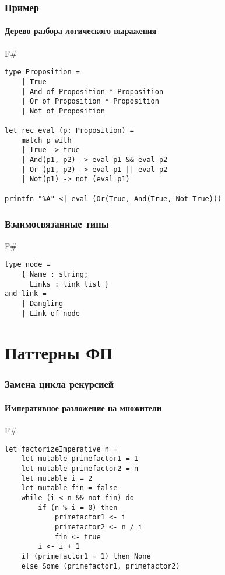 \documentclass[xetex,mathserif,serif]{beamer}
\begin{document}
	\begin{frame}[fragile]
		\frametitle{Пример}
		\framesubtitle{Дерево разбора логического выражения}
		\begin{exampleblock}{F\#}
			\begin{lstlisting}
type Proposition =
    | True
    | And of Proposition * Proposition
    | Or of Proposition * Proposition
    | Not of Proposition

let rec eval (p: Proposition) =
    match p with
    | True -> true
    | And(p1, p2) -> eval p1 && eval p2
    | Or (p1, p2) -> eval p1 || eval p2
    | Not(p1) -> not (eval p1)

printfn "%A" <| eval (Or(True, And(True, Not True)))
\end{lstlisting}
\end{exampleblock}
		
\end{frame}

	\begin{frame}[fragile]
		\frametitle{Взаимосвязанные типы}
		\begin{exampleblock}{F\#}
			\begin{lstlisting}
type node =
    { Name : string;
      Links : link list }
and link =
    | Dangling
    | Link of node
\end{lstlisting}
\end{exampleblock}
		
\end{frame}

	\section{Паттерны ФП}

	\begin{frame}[fragile]
		\frametitle{Замена цикла рекурсией}
		\framesubtitle{Императивное разложение на множители}
		\begin{exampleblock}{F\#}
			\begin{lstlisting}
let factorizeImperative n =
    let mutable primefactor1 = 1
    let mutable primefactor2 = n
    let mutable i = 2
    let mutable fin = false
    while (i < n && not fin) do
        if (n % i = 0) then
            primefactor1 <- i
            primefactor2 <- n / i
            fin <- true
        i <- i + 1
    if (primefactor1 = 1) then None
    else Some (primefactor1, primefactor2)
\end{lstlisting}
\end{exampleblock}

\end{frame}
\end{document}
